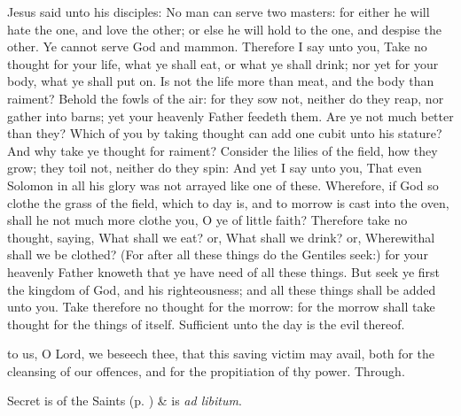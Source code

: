  Jesus said unto his disciples: No man can serve two masters: for either he will hate the one, and love the other; or else he will hold to the one, and despise the other. Ye cannot serve God and mammon. Therefore I say unto you, Take no thought for your life, what ye shall eat, or what ye shall drink; nor yet for your body, what ye shall put on. Is not the life more than meat, and the body than raiment? Behold the fowls of the air: for they sow not, neither do they reap, nor gather into barns; yet your heavenly Father feedeth them. Are ye not much better than they? Which of you by taking thought can add one cubit unto his stature? And why take ye thought for raiment? Consider the lilies of the field, how they grow; they toil not, neither do they spin: And yet I say unto you, That even Solomon in all his glory was not arrayed like one of these. Wherefore, if God so clothe the grass of the field, which to day is, and to morrow is cast into the oven, shall he not much more clothe you, O ye of little faith? Therefore take no thought, saying, What shall we eat? or, What shall we drink? or, Wherewithal shall we be clothed? (For after all these things do the Gentiles seek:) for your heavenly Father knoweth that ye have need of all these things. But seek ye first the kingdom of God, and his righteousness; and all these things shall be added unto you. Take therefore no thought for the morrow: for the morrow shall take thought for the things of itself. Sufficient unto the day is the evil thereof.


\vspace{-2ex}

\secret
{} to us, O Lord, we beseech thee, that this saving victim may avail, both for the cleansing of our offences, and for the propitiation of thy power. Through.
\begin{rubric}
     Secret is of the Saints (p. \pageref{SPSaints}) \&  is \emph{ad libitum}.
\end{rubric}


\vspace{-2ex}

